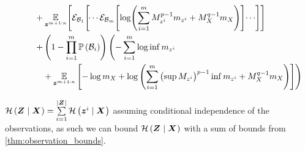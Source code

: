 \begin{propositionE}
\begin{equation}
\begin{split}
			& \quad\phantomeq+\E_{\observationRV{}{m+1:n}}\Biggl[\partexp_{\subSpace_1}\Biggl[\dotsi\partexp_{\subSpace_m}\Biggl[
			\log \Biggl(\sum_{i=1}^{m} M_{\observation{}{i}}^{p-1}m_{\observation{}{i}}+M_{\states{}}^{q-1}m_{\states{}}\Biggr)\Biggr]\dotsi\Biggr]\Biggr]                                                                    \\
			& \quad\phantomeq+\left(1-\prod_{i=1}^m\measure{\subSpace_i}\right)\Biggl(-\sum_{i=1}^m\log \inf m_{\observation{}{i}}\\
			& \quad\quad\phantomeq+\E_{\observationRV{}{m+1:n}}\left[-\log m_{\states{}}+\log\left(\sum_{i=1}^{m}\left(\sup M_{\observation{}{i}}\right)^{p-1}\inf m_{\observation{}{i}} +M_{\states{}}^{q-1}m_{\states{}}\right)\right]\Biggr)
		\end{split}
	\end{equation}
\end{propositionE}
\begin{proofE}
	$\mathcal{H}\left({\boldsymbol Z_{}}\mid{\ensuremath{\boldsymbol X_{}}}\right)=\sum\limits_{i=1}^{\lvert\boldsymbol Z_{}\rvert}\mathcal{H}\left({\boldsymbol z_{}^{i}}\mid{\ensuremath{\boldsymbol X_{}}}\right)$ assuming conditional independence of the observations, as such we can bound $\mathcal{H}\left({\boldsymbol Z_{}}\mid{\ensuremath{\boldsymbol X_{}}}\right)$ with a sum of bounds from \cref{thm:observation_bounds}.
\end{proofE}


